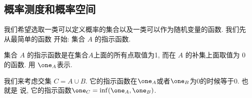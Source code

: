 \subsection*{概率测度和概率空间}

我们希望选取一类可以定义概率的集合以及一类可以作为随机变量的函数. 我们先从最简单的函数
开始: 集合 $A$ 的指示函数.

\begin{definition*}
    集合 $A$ 的指示函数是在集合$A$上面的所有点取值为1, 而在 $A$ 的补集上面取值为
    0的函数. 用 $\one_A$表示.
\end{definition*}

我们来考虑交集 $C=A\cup B$. 它的指示函数在$\one_A$或者$\one_B$为0的时候等于0. 也就是
说, 它的指示函数$\one_C=\inf(\one_A, \one_B)$.

